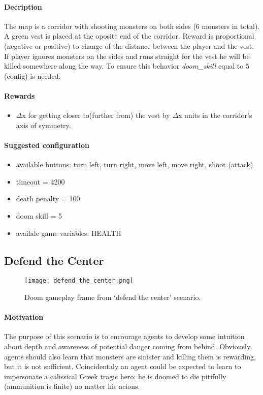 		\paragraph{Decription}
			The map is a corridor with shooting monsters on both sides (6 monsters in total). A green vest is placed at the oposite end of the corridor. Reward is proportional (negative or positive) to change of the distance between the player and the vest. If player ignores monsters on the sides and runs straight for the vest he will be killed somewhere along the way. To ensure this behavior \textit{doom\_skill} equal to 5 (config) is needed.

		\paragraph{Rewards}
			\begin{itemize}
				\item $\Delta$x for getting closer to(further from) the vest by $\Delta$x units in the corridor's axis of symmetry.
			\end{itemize}
			
		\paragraph{Suggested configuration}
			\begin{itemize}
				\item available buttons: turn left, turn right, move left, move right, shoot (attack)
				\item timeout = 4200
				\item death penalty = 100
				\item doom skill = 5
				\item availale game variables: HEALTH
			\end{itemize}
	\newpage

	\subsection{Defend the Center}\label{subsec:defend_the_center}
		\begin{figure}
			\centering
			\texttt{[image: defend\_the\_center.png]}
			\caption{Doom gameplay frame from `defend the center' scenario.}\label{fig:basic}
		\end{figure}
		\paragraph{Motivation} 
			The purpose of this scenario is to encourage agents to develop some intuition about depth and awareness of potential danger coming from behind. Obviously, agents should also learn that monsters are sinister and killing them is rewarding, but it is not sufficient. Coincidentaly an agent could be expected to learn to impersonate a calissical Greek tragic hero: he is doomed to die pitifully (ammunition is finite) no matter his acions.

